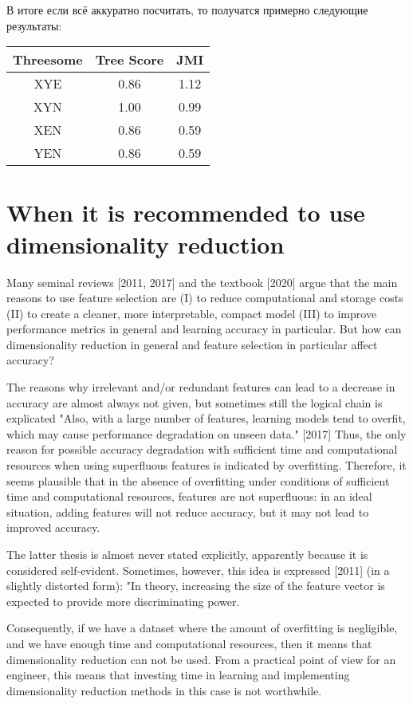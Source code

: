 \documentclass[12pt]{a&t}
\begin{document}
В итоге если всё аккуратно посчитать, то получатся примерно следующие результаты:

\begin{center}
\begin{tabular}{ |c||c|c| } 
  \hline
  Threesome & Tree Score & JMI \\
 \hline
 \hline
 XYE & 0.86 & 1.12 \\ 
 XYN & 1.00 & 0.99 \\ 
 XEN & 0.86 & 0.59 \\ 
 YEN & 0.86 & 0.59 \\ 
 \hline
\end{tabular}
\end{center}


\section{When it is recommended to use dimensionality reduction }

Many seminal reviews [2011, 2017] and the textbook [2020] argue that the main reasons to use feature selection are (I) to reduce computational and storage costs (II) to create a cleaner, more interpretable, compact model (III) to improve performance metrics in general and learning accuracy in particular. But how can dimensionality reduction in general and feature selection in particular affect accuracy? 

The reasons why irrelevant and/or redundant features can lead to a decrease in accuracy are almost always not given, but sometimes still the logical chain is explicated "Also, with a large number of features, learning models tend to overfit, which may cause performance degradation on unseen data." [2017] Thus, the only reason for possible accuracy degradation with sufficient time and computational resources when using superfluous features is indicated by overfitting. Therefore, it seems plausible that in the absence of overfitting under conditions of sufficient time and computational resources, features are not superfluous: in an ideal situation, adding features will not reduce accuracy, but it may not lead to improved accuracy. 

The latter thesis is almost never stated explicitly, apparently because it is considered self-evident. 
Sometimes, however, this idea is expressed [2011] (in a slightly distorted form): "In theory, increasing the size of the feature vector is expected to provide more discriminating power.

Consequently, if we have a dataset where the amount of overfitting is negligible, and we have enough time and computational resources, then it means that dimensionality reduction can not be used. From a practical point of view for an engineer, this means that investing time in learning and implementing dimensionality reduction methods in this case is not worthwhile. 
\end{document}
